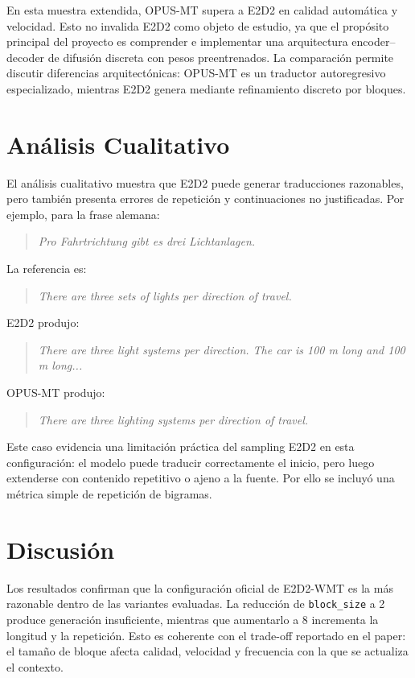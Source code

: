 \documentclass[conference]{IEEEtran}
\begin{document}
En esta muestra extendida, OPUS-MT supera a E2D2 en calidad automática y velocidad. Esto no invalida E2D2 como objeto de estudio, ya que el propósito principal del proyecto es comprender e implementar una arquitectura encoder--decoder de difusión discreta con pesos preentrenados. La comparación permite discutir diferencias arquitectónicas: OPUS-MT es un traductor autoregresivo especializado, mientras E2D2 genera mediante refinamiento discreto por bloques.

\section{Análisis Cualitativo}

El análisis cualitativo muestra que E2D2 puede generar traducciones razonables, pero también presenta errores de repetición y continuaciones no justificadas. Por ejemplo, para la frase alemana:

\begin{quote}
\emph{Pro Fahrtrichtung gibt es drei Lichtanlagen.}
\end{quote}

La referencia es:

\begin{quote}
\emph{There are three sets of lights per direction of travel.}
\end{quote}

E2D2 produjo:

\begin{quote}
\emph{There are three light systems per direction. The car is 100 m long and 100 m long...}
\end{quote}

OPUS-MT produjo:

\begin{quote}
\emph{There are three lighting systems per direction of travel.}
\end{quote}

Este caso evidencia una limitación práctica del sampling E2D2 en esta configuración: el modelo puede traducir correctamente el inicio, pero luego extenderse con contenido repetitivo o ajeno a la fuente. Por ello se incluyó una métrica simple de repetición de bigramas.

\section{Discusión}

Los resultados confirman que la configuración oficial de E2D2-WMT es la más razonable dentro de las variantes evaluadas. La reducción de \texttt{block\_size} a 2 produce generación insuficiente, mientras que aumentarlo a 8 incrementa la longitud y la repetición. Esto es coherente con el trade-off reportado en el paper: el tamaño de bloque afecta calidad, velocidad y frecuencia con la que se actualiza el contexto.
\end{document}
